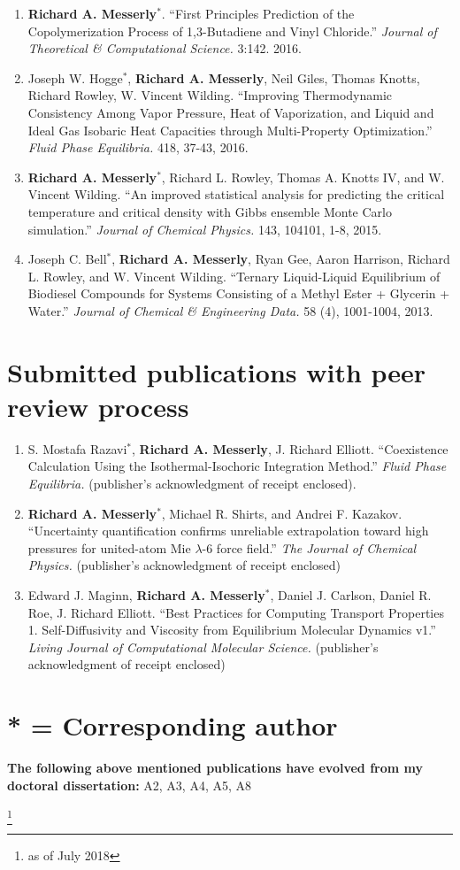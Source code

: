 \documentclass[12pt]{article}
\newcommand\blfootnote[1]{%
	\begingroup
	\renewcommand\thefootnote{}\footnote{#1}%
	\addtocounter{footnote}{-1}%
	\endgroup
}
\begin{document}
\begin{enumerate}
\item \textbf{Richard A. Messerly}$^*$. ``First Principles Prediction of the Copolymerization Process of 1,3-Butadiene and Vinyl Chloride.'' \textit{Journal of Theoretical \& Computational Science.} 3:142. 2016.

\item Joseph W. Hogge$^*$, \textbf{Richard A. Messerly}, Neil Giles, Thomas Knotts, Richard Rowley, W. Vincent Wilding. ``Improving Thermodynamic Consistency Among Vapor Pressure, Heat of Vaporization, and Liquid and Ideal Gas Isobaric Heat Capacities through Multi{-}Property Optimization.'' \textit{Fluid Phase Equilibria.} 418, 37-43, 2016.

\item \textbf{Richard A. Messerly}$^*$, Richard L. Rowley, Thomas A. Knotts IV, and W. Vincent Wilding. ``An improved statistical analysis for predicting the critical temperature and critical density with Gibbs ensemble Monte Carlo simulation.'' \textit{Journal of Chemical Physics.} 143, 104101, 1-8, 2015.

\item Joseph C. Bell$^*$, \textbf{Richard A. Messerly}, Ryan Gee, Aaron Harrison, Richard L. Rowley, and W. Vincent Wilding. ``Ternary Liquid{-}Liquid Equilibrium of Biodiesel Compounds for Systems Consisting of a Methyl Ester + Glycerin + Water.'' \textit{Journal of Chemical \& Engineering Data.} 58 (4), 1001-1004, 2013.

\end{enumerate}

\section{Submitted publications with peer review process}

\begin{enumerate}
	
\item S. Mostafa Razavi$^*$, \textbf{Richard A. Messerly}, J. Richard Elliott. ``Coexistence Calculation Using the Isothermal-Isochoric Integration Method.'' \textit{Fluid Phase Equilibria.} (publisher's acknowledgment of receipt enclosed).

\item \textbf{Richard A. Messerly}$^*$, Michael R. Shirts, and Andrei F. Kazakov. ``Uncertainty quantification confirms unreliable extrapolation toward high pressures for united-atom Mie $\lambda$-6 force field.'' \textit{The Journal of Chemical Physics.} (publisher's acknowledgment of receipt enclosed)

\item Edward J. Maginn, \textbf{Richard A. Messerly}$^*$, Daniel J. Carlson, Daniel R. Roe, J. Richard Elliott. ``Best Practices for Computing Transport Properties 1. Self-Diffusivity and Viscosity from Equilibrium Molecular Dynamics v1.'' \textit{Living Journal of Computational Molecular Science.} (publisher's acknowledgment of receipt enclosed)

\end{enumerate}

\section*{* = Corresponding author}

\textbf{The following above mentioned publications have evolved from my doctoral dissertation:} A2, A3, A4, A5, A8

\blfootnote{as of July 2018}
\end{document}

